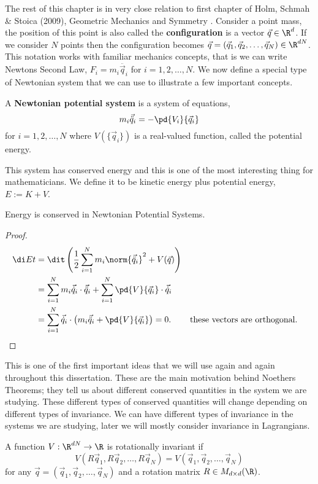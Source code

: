 \noindent
The rest of this chapter is in very close relation to first chapter of Holm, Schmah \& Stoica (2009), Geometric Mechanics and Symmetry \cite{holm_schmah_stoica_2009}. Consider a point mass, the position of this point is also called the \textbf{configuration} is a vector $\vec q \in \R^d$. If we consider $N$ points then the configuration becomes $\vec q = (\vec q_1, \vec q_2, \dots, \vec q_N) \in \R^{dN}$. This notation works with familiar mechanics concepts, that is we can write Newtons Second Law, $F_i = m_i\ddot{\vec q_i}$ for $i = 1, 2, \dots, N$.
We now define a special type of Newtonian system that we can use to illustrate a few important concepts.

\begin{ndefi}
  A \textbf{Newtonian potential system} is a system of equations,
  $$ m_i\vec{\ddot q}_i = -\pd{V_i}{\vec q_i} $$
  for $i = 1, 2, \dots, N$ where $V(\{\vec q_i\})$ is a real-valued function, called the potential energy.
\end{ndefi}
\noindent
This system has conserved energy and this is one of the most interesting thing for mathematicians. We define it to be kinetic energy plus potential energy, $E := K + V$.
\begin{nthm}
  Energy is conserved in Newtonian Potential Systems.
\end{nthm}
\begin{proof}
  \begin{align*}
    \di E t &= \dit \left( \frac{1}{2}\sum_{i=1}^N m_i\norm{\vec{\ddot q}_i}^2 + V(\vec q) \right)\\
    &= \sum_{i=1}^N m_i \vec{\dot q}_i \cdot \vec{\ddot q}_i + \sum_{i=1}^N \pd{V}{\vec q_i} \cdot \vec{\dot q}_i\\
    &= \sum_{i=1}^N \vec{\dot q}_i \cdot \left( m_i \vec{\ddot q}_i + \pd{V}{\vec q_i} \right) = 0. && \text{these vectors are orthogonal.}
  \end{align*}
\end{proof}

\noindent
This is one of the first important ideas that we will use again and again throughout this dissertation. These are the main motivation behind Noethers Theorems; they tell us about different conserved quantities in the system we are studying. These different types of conserved quantities will change depending on different types of invariance. We can have different types of invariance in the systems we are studying, later we will mostly consider invariance in Lagrangians.
\begin{ndefi}
  A function $V : \R^{dN} \to \R$ is rotationally invariant if
  $$ V(R\vec q_1, R\vec q_2, \dots, R\vec q_N) = V(\vec q_1, \vec q_2, \dots, \vec q_N) $$
  for any $\vec q = (\vec q_1, \vec q_2, \dots, \vec q_N)$ and a rotation matrix $R \in M_{d \times d}(\R)$.
\end{ndefi}

